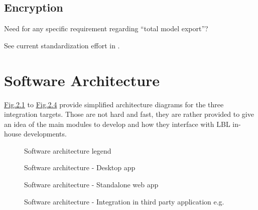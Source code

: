 \documentclass[letterpaper,10pt, openany,english]{sphinxmanual}
\begin{document}
\section{Encryption}
\label{\detokenize{requirements:encryption}}
Need for any specific requirement regarding “total model export”?

See current standardization effort in .


\chapter{Software Architecture}
\label{\detokenize{architecture:software-architecture}}\label{\detokenize{architecture:sec-architecture}}\label{\detokenize{architecture::doc}}
\hyperref[\detokenize{architecture:linkage-architecture-legend}]{Fig.\@ \ref{\detokenize{architecture:linkage-architecture-legend}}} to \hyperref[\detokenize{architecture:linkage-architecture-os}]{Fig.\@ \ref{\detokenize{architecture:linkage-architecture-os}}} provide simplified architecture diagrams for the three integration targets.
Those are not hard and fast, they are rather provided to give an idea of the main modules to develop and how they interface with LBL in-house developments.

\begin{figure}[htbp]
\centering
\capstart

\noindent{}
\caption{Software architecture legend}\label{\detokenize{architecture:linkage-architecture-legend}}\end{figure}

\begin{figure}[htbp]
\centering
\capstart

\noindent{}
\caption{Software architecture - Desktop app}\label{\detokenize{architecture:linkage-architecture}}\end{figure}

\begin{figure}[htbp]
\centering
\capstart

\noindent{}
\caption{Software architecture - Standalone web app}\label{\detokenize{architecture:linkage-architecture-spa}}\end{figure}

\begin{figure}[htbp]
\centering
\capstart

\noindent{}
\caption{Software architecture - Integration in third party application e.g. }\label{\detokenize{architecture:linkage-architecture-os}}\end{figure}
\end{document}
